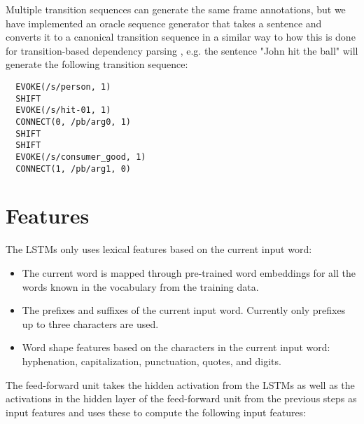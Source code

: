 \documentclass[11pt,a4paper]{article}
\begin{document}
Multiple transition sequences can generate the same frame annotations, but we
have implemented an oracle sequence generator that takes a sentence and converts
it to a canonical transition sequence in a similar way to how this is done
for transition-based dependency parsing \cite{nivre2006}, e.g. the sentence
"John hit the ball" will generate the following transition sequence:
\begin{verbatim}
  EVOKE(/s/person, 1)
  SHIFT
  EVOKE(/s/hit-01, 1)
  CONNECT(0, /pb/arg0, 1)
  SHIFT
  SHIFT
  EVOKE(/s/consumer_good, 1)
  CONNECT(1, /pb/arg1, 0)
\end{verbatim}

\section{Features}
\label{sec:features}

The LSTMs only uses lexical features based on the current input word:

\begin{itemize}
  \item The current word is mapped through pre-trained word embeddings
  \cite{mikolov2013} for all the words known in the vocabulary from the
  training data.
  \item The prefixes and suffixes of the current input word. Currently only
  prefixes up to three characters are used.
  \item Word shape features based on the characters in the current input word:
  hyphenation, capitalization, punctuation, quotes, and digits.
\end{itemize}

The feed-forward unit takes the hidden activation from the LSTMs as well as the
activations in the hidden layer of the feed-forward unit from the previous steps
as input features and uses these to compute the following input features:
\end{document}
